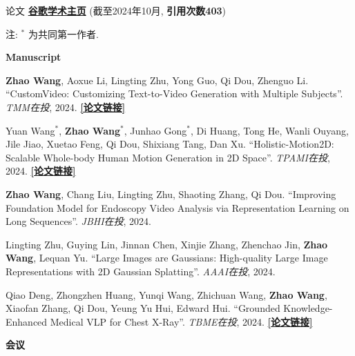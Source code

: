 \documentclass[a4paper]{resume} %
\begin{document}
\begin{rSection}{论文}
\href{https://scholar.google.com/citations?user=1kEufdwAAAAJ}{\bf 谷歌学术主页} (截至2024年10月, {\bf 引用次数403})
\vspace{-0.3em}

注: {\bf $^*$} 为共同第一作者.

\vspace{0.3em}
{\bf Manuscript}
\vspace{-0.2em}
\begin{enumerate}[label={[M\arabic*]}, topsep=0em, leftmargin=1.4em, itemsep=-0.5em]
	\item {\bf Zhao Wang}, Aoxue Li, Lingting Zhu, Yong Guo, Qi Dou, Zhenguo Li. “CustomVideo: Customizing Text-to-Video Generation with Multiple Subjects”. {\it TMM在投}, 2024. \href{https://arxiv.org/abs/2401.09962}{\bf [论文链接]}
	\item Yuan Wang$^*$, {\bf Zhao Wang}$^*$, Junhao Gong$^*$, Di Huang, Tong He, Wanli Ouyang, Jile Jiao, Xuetao Feng, Qi Dou, Shixiang Tang, Dan Xu. “Holistic-Motion2D: Scalable Whole-body Human Motion Generation in 2D Space”. {\it TPAMI在投}, 2024. \href{https://arxiv.org/abs/2406.11253}{\bf [论文链接]}
	\item {\bf Zhao Wang}, Chang Liu, Lingting Zhu, Shaoting Zhang, Qi Dou. “Improving Foundation Model for Endoscopy Video Analysis via Representation Learning on Long Sequences”. {\it JBHI在投}, 2024. 
	\item Lingting Zhu, Guying Lin, Jinnan Chen, Xinjie Zhang, Zhenchao Jin, {\bf Zhao Wang}, Lequan Yu. “Large Images are Gaussians: High-quality Large Image Representations with 2D Gaussian Splatting”. {\it AAAI在投}, 2024. 
	\item Qiao Deng, Zhongzhen Huang, Yunqi Wang, Zhichuan Wang, {\bf Zhao Wang}, Xiaofan Zhang, Qi Dou, Yeung Yu Hui, Edward Hui. “Grounded Knowledge-Enhanced Medical VLP for Chest X-Ray”. {\it TBME在投}, 2024. \href{https://arxiv.org/abs/2404.14750}{\bf [论文链接]}
    	
\end{enumerate}

\vspace{0.3em}
{\bf 会议}
\vspace{-0.2em}
\begin{enumerate}[label={[C\arabic*]}, topsep=0em, leftmargin=1.2em, itemsep=-0.5em]


\end{enumerate}
\end{rSection}
\end{document}
